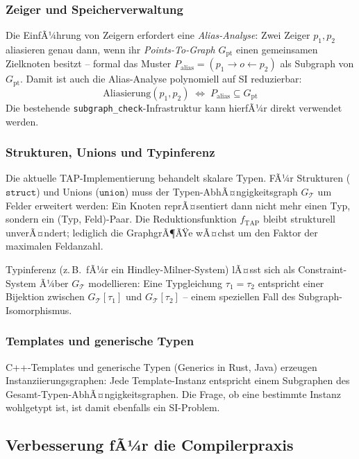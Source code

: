 ﻿\documentclass[a4paper,12pt]{article}
\theoremstyle{definition}
\begin{document}
\subsubsection{Zeiger und Speicherverwaltung}

Die EinfÃ¼hrung von Zeigern erfordert eine \emph{Alias-Analyse}: Zwei
Zeiger $p_1, p_2$ aliasieren genau dann, wenn ihr \emph{Points-To-Graph}
$G_{\mathrm{pt}}$ einen gemeinsamen Zielknoten besitzt -- formal das
Muster $P_{\mathrm{alias}} = (p_1 \to o \leftarrow p_2)$ als Subgraph
von $G_{\mathrm{pt}}$. Damit ist auch die Alias-Analyse polynomiell auf
SI reduzierbar:
\[
\text{Aliasierung}(p_1, p_2) \;\Leftrightarrow\;
P_{\mathrm{alias}} \subseteq G_{\mathrm{pt}}
\]
Die bestehende \texttt{subgraph\_check}-Infrastruktur kann hierfÃ¼r direkt
verwendet werden.

\subsubsection{Strukturen, Unions und Typinferenz}

Die aktuelle TAP-Implementierung behandelt skalare Typen. FÃ¼r Strukturen
($\mathtt{struct}$) und Unions ($\mathtt{union}$) muss der
Typen-AbhÃ¤ngigkeitsgraph $G_{\mathcal{T}}$ um Felder erweitert werden:
Ein Knoten reprÃ¤sentiert dann nicht mehr einen Typ, sondern ein
(Typ, Feld)-Paar. Die Reduktionsfunktion $f_{\mathrm{TAP}}$ bleibt
strukturell unverÃ¤ndert; lediglich die GraphgrÃ¶ÃŸe wÃ¤chst um den Faktor
der maximalen Feldanzahl.

Typinferenz (z.\,B.\ fÃ¼r ein Hindley-Milner-System) lÃ¤sst sich als
Constraint-System Ã¼ber $G_{\mathcal{T}}$ modellieren: Eine
Typgleichung $\tau_1 = \tau_2$ entspricht einer Bijektion zwischen
$G_{\mathcal{T}}[\tau_1]$ und $G_{\mathcal{T}}[\tau_2]$ -- einem
speziellen Fall des Subgraph-Isomorphismus.

\subsubsection{Templates und generische Typen}

C++-Templates und generische Typen (Generics in Rust, Java) erzeugen
Instanziierungsgraphen: Jede Template-Instanz entspricht einem
Subgraphen des Gesamt-Typen-AbhÃ¤ngigkeitsgraphen. Die Frage, ob eine
bestimmte Instanz wohlgetypt ist, ist damit ebenfalls ein SI-Problem.

\subsection{Verbesserung fÃ¼r die Compilerpraxis}
\label{sec:ausblick-algo}
\end{document}
